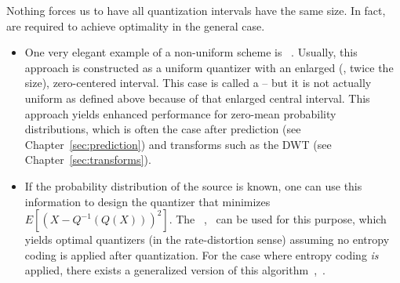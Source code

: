 Nothing forces us to have all quantization intervals have the same size. In fact,
 are required to achieve
optimality in the general case.
\begin{itemize}
\item One very elegant example of a non-uniform scheme is ~\cite[Eq.~3.30]{taubman2002jpeg2000}. Usually, this approach is constructed as a uniform quantizer
with an enlarged (\eg, twice the size), zero-centered interval. This case is called a
 -- but it is not actually uniform as defined above
because of that enlarged central interval. This approach yields enhanced performance
for zero-mean probability distributions, which is often the case after prediction (see Chapter~\ref{sec:prediction}) and transforms such as the DWT (see Chapter~\ref{sec:transforms}).
\vspace{0.1cm}

\item If the probability distribution of the source \source is known, one can use this information
to design the quantizer that minimizes $E[\left(X - Q^{-1}(Q(X))\right)^2]$.
The ~\cite[\S 3.2.1]{taubman2002jpeg2000},~\cite[\S 9.6.1]{sayood_introduction} can be used for this purpose,
which yields optimal quantizers (in the rate-distortion sense) assuming no entropy coding
is applied after quantization.
%
For the case where entropy coding \textit{is} applied, there exists a generalized version
of this algorithm~\cite[\S 3.2.3]{taubman2002jpeg2000},~\cite[\S 9.7.1]{sayood_introduction}.

\end{itemize}



%
%


